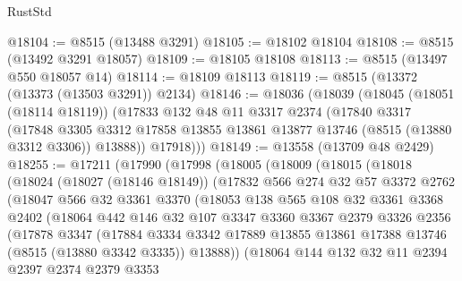\begin{lexlean}{RustStd}
\begin{coremodule}
@18104 := @8515 (@13488 @3291)
@18105 := @18102 @18104
@18108 := @8515 (@13492 @3291 @18057)
@18109 := @18105 @18108
@18113 := @8515 (@13497 @550 @18057 @14)
@18114 := @18109 @18113
@18119 := @8515 (@13372 (@13373 (@13503 @3291)) @2134)
@18146 := @18036
    (@18039
      (@18045
        (@18051 (@18114 @18119))
        (@17833
          @132
          @48
          @11
          @3317
          @2374
          (@17840
            @3317
            (@17848
              @3305
              @3312
              @17858
              @13855
              @13861
              @13877
              @13746
              (@8515 (@13880 @3312 @3306))
              @13888))
          @17918)))
@18149 := @13558 (@13709 @48 @2429)
@18255 := @17211
    (@17990
      (@17998
        (@18005
          (@18009
            (@18015
              (@18018
                (@18024
                  (@18027 (@18146 @18149))
                  (@17832
                    @566
                    @274
                    @32
                    @57
                    @3372
                    @2762
                    (@18047
                      @566
                      @32
                      @3361
                      @3370
                      (@18053
                        @138
                        @565
                        @108
                        @32
                        @3361
                        @3368
                        @2402
                        (@18064
                          @442
                          @146
                          @32
                          @107
                          @3347
                          @3360
                          @3367
                          @2379
                          @3326
                          @2356
                          (@17878
                            @3347
                            (@17884
                              @3334
                              @3342
                              @17889
                              @13855
                              @13861
                              @17388
                              @13746
                              (@8515 (@13880 @3342 @3335))
                              @13888))
                          (@18064
                            @144
                            @132
                            @32
                            @11
                            @2394
                            @2397
                            @2374
                            @2379
                            @3353

\end{coremodule}
\end{lexlean}
